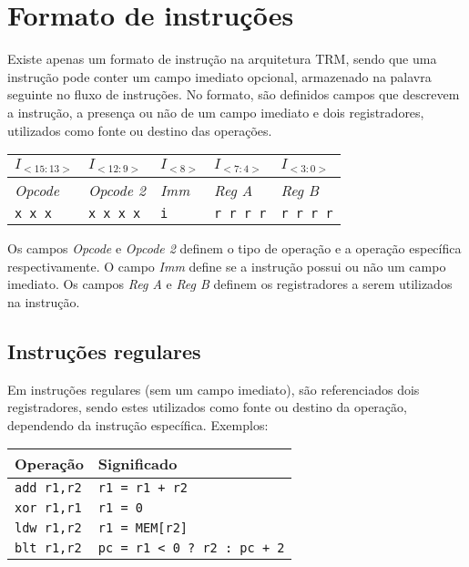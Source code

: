 \documentclass[11pt,a4paper]{report}
\begin{document}
\section{Formato de instruções}

Existe apenas um formato de instrução na arquitetura TRM, sendo que uma
instrução pode conter um campo imediato opcional, armazenado na palavra
seguinte no fluxo de instruções. No formato, são definidos campos que
descrevem a instrução, a presença ou não de um campo imediato e dois
registradores, utilizados como fonte ou destino das operações.

\begin{table}[htb!]
\centering
\begin{tabular}{|p{2cm}|p{2cm}|p{2cm}|p{2cm}|p{2cm}|}
\hline
$I_{<15:13>}$ & $I_{<12:9>}$ & $I_{<8>}$ & $I_{<7:4>}$ & $I_{<3:0>}$  \\ \hline
\textit{Opcode} & \textit{Opcode 2} & \textit{Imm} & \textit{Reg A} & \textit{Reg B} \\ \hline
\texttt{x x x} & \texttt{x x x x} & \texttt{i} & \texttt{r r r r} & \texttt{r r r r} \\ \hline
\end{tabular}
\end{table}

Os campos \textit{Opcode} e \textit{Opcode 2} definem o tipo de operação
e a operação específica respectivamente. O campo \textit{Imm} define se
a instrução possui ou não um campo imediato. Os campos \textit{Reg A} e 
\textit{Reg B} definem os registradores a serem utilizados na instrução.

\subsection{Instruções regulares}

Em instruções regulares (sem um campo imediato), são referenciados dois
registradores, sendo estes utilizados como fonte ou destino da operação,
dependendo da instrução específica. Exemplos:

\begin{table}[htb!]
\centering
\begin{tabular}{|p{5.0cm}|p{8.0cm}|}
\hline
\bf{Operação} & \bf{Significado} \\ \hline \hline
\texttt{add r1,r2} & \verb|r1 = r1 + r2| \\ \hline
\texttt{xor r1,r1} & \verb|r1 = 0| \\ \hline
\texttt{ldw r1,r2} & \verb|r1 = MEM[r2]| \\ \hline
\texttt{blt r1,r2} & \verb|pc = r1 < 0 ? r2 : pc + 2| \\ \hline
\end{tabular}
\end{table}
\end{document}
